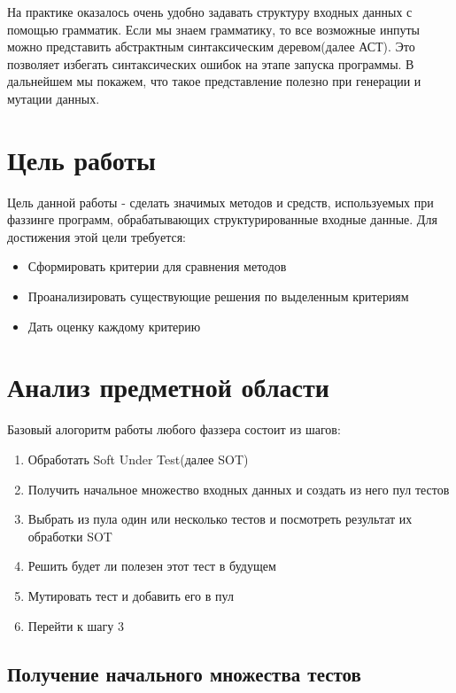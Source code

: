 \documentclass[a4paper]{article}
\begin{document}
На практике оказалось очень удобно задавать структуру входных данных с помощью грамматик. Если мы знаем грамматику, то все возможные инпуты можно представить абстрактным синтаксическим деревом(далее АСТ). Это позволяет избегать синтаксических ошибок на этапе запуска программы. В дальнейшем мы покажем, что такое представление полезно при генерации и мутации данных.

\newpage

\section{Цель работы}
\indent

Цель данной работы - сделать значимых методов и средств, используемых при фаззинге программ, обрабатывающих структурированные входные данные. Для достижения этой цели требуется:

\begin{itemize}
\item Сформировать критерии для сравнения методов
\item Проанализировать существующие решения по выделенным критериям
\item Дать оценку каждому критерию
\end{itemize}

\newpage
\section{Анализ предметной области}
\indent
 
Базовый алогоритм работы любого фаззера состоит из шагов:

\begin{enumerate}
    \item Обработать Soft Under Test(далее SOT)
    \item Получить начальное множество входных данных и создать из него пул тестов
    \item Выбрать из пула один или несколько тестов и посмотреть результат их обработки SOT 
    \item Решить будет ли полезен этот тест в будущем
    \item Мутировать тест и добавить его в пул
    \item Перейти к шагу 3
\end{enumerate}

\subsection{Получение начального множества тестов}
\indent
\end{document}
